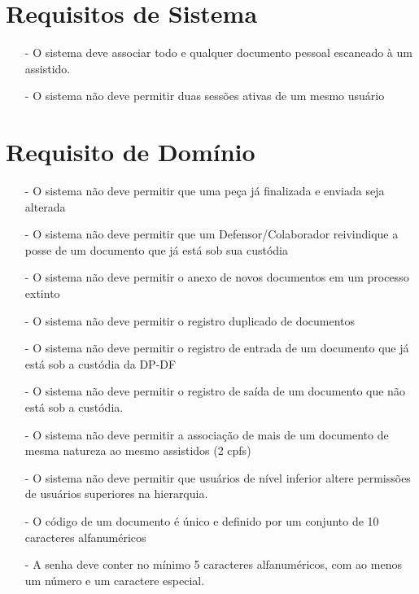 \documentclass[12pt,a4paper]{report}
\begin{document}
\chapter{Requisitos de Sistema}
\begin{itemize}
\item[-]  O sistema deve associar todo e qualquer documento pessoal escaneado à um assistido.
\item[-]  O sistema não deve permitir duas sessões ativas de um mesmo usuário
\end{itemize}

\chapter{Requisito de Domínio}
\begin{itemize}
\item[-]  O sistema não deve permitir que uma peça já finalizada e enviada seja alterada
\item[-]  O sistema não deve permitir que um Defensor/Colaborador reivindique a posse de um documento que já está sob sua custódia
\item[-]  O sistema não deve permitir o anexo de novos documentos em um processo extinto
\item[-]  O sistema não deve permitir o registro duplicado de documentos
\item[-]  O sistema não deve permitir o registro de entrada de um documento que já está sob a custódia da DP-DF
\item[-]  O sistema não deve permitir o registro de saída de um documento que não está sob a custódia.
\item[-]  O sistema não deve permitir a associação de mais de um documento de mesma natureza ao mesmo assistidos (2 cpfs)
\item[-]  O sistema não deve permitir que usuários de nível inferior altere permissões de usuários superiores na hierarquia.
\item[-]  O código de um documento é único e definido por um conjunto de 10 caracteres alfanuméricos
\item[-]  A senha deve conter no mínimo 5 caracteres alfanuméricos, com ao menos um número e um caractere especial.
\end{itemize}
\end{document}
